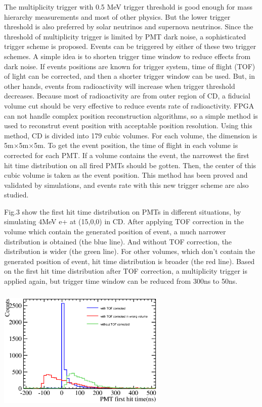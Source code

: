 \documentclass[a4paper,10pt,twoside]{paper}
\begin{document}
\begin{multicols}{2}
		The multiplicity trigger with 0.5 MeV trigger threshold is good enough for mass hierarchy measurements and most of other physics. 
		But the lower trigger threshold is also preferred by solar neutrinos and supernova neutrinos.
		Since the threshold of multiplicity trigger is limited by PMT dark noise, a sophisticated trigger scheme is proposed.
		Events can be triggered by either of these two trigger schemes. A simple idea is to shorten trigger time window to reduce effects from dark noise.
		If events positions are known for trigger system, time of flight (TOF) of light can be corrected, and then a shorter trigger window can be used.
		But, in other hands, events from radioactivity will increase when trigger threshold decreases.
		Because most of radioactivity are from outer region of CD, a fiducial volume cut should be very effective to reduce events rate of radioactivity.
		FPGA can not handle complex position reconstruction algorithms, so a simple method is used to reconstrut event position with acceptable position resolution.
		Using this method, CD is divided into 179 cubic volumes. For each volume, the dimension is 5m$\times$5m$\times$5m.
		To get the event position, the time of flight in each volume is corrected for each PMT. If a volume contains the event, 
		the narrowest the first hit time distribution on all fired PMTs should be gotten. 
		Then, the center of this cubic volume is taken as the event position.
		This method has been proved and validated by simulations, and events rate with this new trigger scheme are also studied.


		Fig.3 show the first hit time distribution on PMTs in different situations,
		by simulating 4MeV e+ at (15,0,0) in CD. After applying TOF correction in the 
		volume which contain the generated position of event, a much narrower distribution 
		is obtained (the blue line). And without TOF correction, the distribution is wider (the green line).
		For other volumes, which don't contain the generated position of event, hit time distribution is broader (the red line).
		Based on the first hit time distribution after TOF correction, a multiplicity trigger is applied again, but trigger time window can be reduced from
		300ns to 50ns. 

		\begin{center}
			\includegraphics[width=8cm,height=6cm]{4MeV_e+_PMT_first_hitTime_all.eps}
		\end{center}



\end{multicols}
\end{document}
